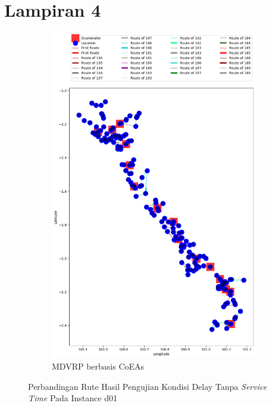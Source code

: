 \chapter*{Lampiran 4}
\label{ch:test_result_delay}


\begin{figure}[H]
	\centering
	\begin{subfigure}[t]{0.9\textwidth}
		\centering
		\includegraphics[width=\textwidth]{Resources/Images/delayed_1/real_m15_n100_delayed_1_coes}
		\caption{MDVRP berbasis CoEAs}
		\label{fig:real_m15_n100_delayed_1_coes}
	\end{subfigure}
	\caption{Perbandingan Rute Hasil Pengujian Kondisi Delay Tanpa \textit{Service Time} Pada Instance d01}
	\label{fig:real_m15_n100_delayed_1}
\end{figure}


